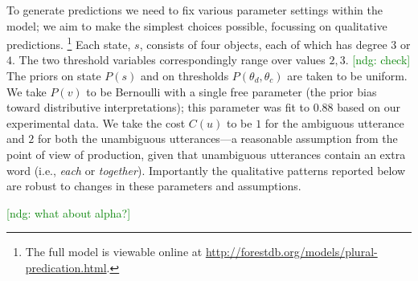 \documentclass[linguex]{sp}
\newcommand{\ndg}[1]{\textcolor{Green}{[ndg: #1]}}
\begin{document}
To generate predictions we need to fix various parameter settings within the model; we aim to make the simplest choices possible, focussing on qualitative predictions. \footnote{The full model is viewable online at \url{http://forestdb.org/models/plural-predication.html}.}
Each state, $s$, consists of four objects, each of which has degree $3$ or $4$. 
The two threshold variables correspondingly range over values $2,3$. \ndg{check}
The priors on state $P(s)$ and on thresholds $P(\theta_d,\theta_c)$ are taken to be uniform.
We take $P(v)$ to be Bernoulli with a single free parameter (the prior bias toward distributive interpretations); this parameter was fit to $0.88$ based on our experimental data.
We take the cost $C(u)$ to be $1$ for the ambiguous utterance and $2$ for both the unambiguous utterances---a reasonable assumption from the point of view of production, given that unambiguous utterances contain an extra word (i.e., \emph{each} or \emph{together}).
Importantly the qualitative patterns reported below are robust to changes in these parameters and assumptions.

\ndg{what about alpha?}

\end{document}
